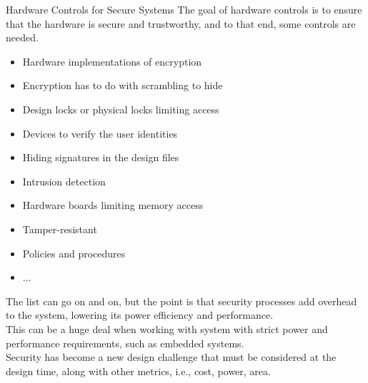 \begin{section}{Hardware Controls for Secure Systems}
  The goal of hardware controls is to ensure that the hardware is secure and trustworthy, and to
  that end, some controls are needed.\\
  \begin{itemize}
    \item Hardware implementations of encryption
    \item Encryption has to do with scrambling to hide
    \item Design locks or physical locks limiting access
    \item Devices to verify the user identities
    \item Hiding signatures in the design files
    \item Intrusion detection
    \item Hardware boards limiting memory access
    \item Tamper-resistant
    \item Policies and procedures
    \item $\dots$
  \end{itemize}
  The list can go on and on, but the point is that security processes add overhead to the system,
  lowering its power efficiency and performance.\\
  This can be a huge deal when working with system with strict power and performance requirements,
  such as embedded systems.\\
  Security has become a new design challenge that must be considered at the design time, along with 
  other metrics, i.e., cost, power, area.
\end{section}

